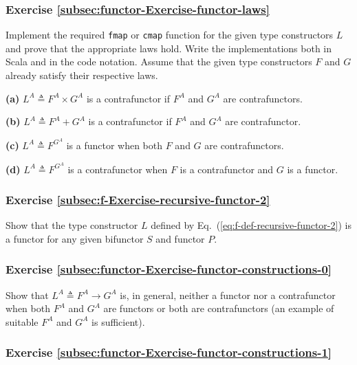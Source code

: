 \subsubsection{Exercise \label{subsec:functor-Exercise-functor-laws}\ref{subsec:functor-Exercise-functor-laws}}

Implement the required \lstinline!fmap! or \lstinline!cmap! function
for the given type constructors $L$ and prove that the appropriate
laws hold. Write the implementations both in Scala and in the code
notation. Assume that the given type constructors $F$ and $G$ already
satisfy their respective laws.

\textbf{(a)} $L^{A}\triangleq F^{A}\times G^{A}$ is a contrafunctor
if $F^{A}$ and $G^{A}$ are contrafunctors.

\textbf{(b)} $L^{A}\triangleq F^{A}+G^{A}$ is a contrafunctor if
$F^{A}$ and $G^{A}$ are contrafunctor.

\textbf{(c)} $L^{A}\triangleq F^{G^{A}}$ is a functor when both $F$
and $G$ are contrafunctors.

\textbf{(d)} $L^{A}\triangleq F^{G^{A}}$ is a contrafunctor when
$F$ is a contrafunctor and $G$ is a functor.

\subsubsection{Exercise \label{subsec:f-Exercise-recursive-functor-2}\ref{subsec:f-Exercise-recursive-functor-2}}

Show that the type constructor $L$ defined by Eq.~(\ref{eq:f-def-recursive-functor-2})
is a functor for any given bifunctor $S$ and functor $P$. 

\subsubsection{Exercise \label{subsec:functor-Exercise-functor-constructions-0}\ref{subsec:functor-Exercise-functor-constructions-0}}

Show that $L^{A}\triangleq F^{A}\rightarrow G^{A}$ is, in general,
neither a functor nor a contrafunctor when both $F^{A}$ and $G^{A}$
are functors or both are contrafunctors (an example of suitable $F^{A}$
and $G^{A}$ is sufficient).

\subsubsection{Exercise \label{subsec:functor-Exercise-functor-constructions-1}\ref{subsec:functor-Exercise-functor-constructions-1}}

